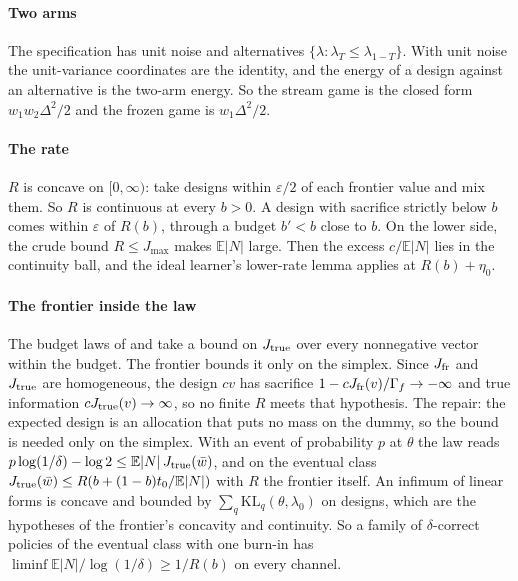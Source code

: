 \paragraph{Two arms} The specification has unit noise and alternatives
$\{\lambda:\lambda_T\le\lambda_{1-T}\}$. With unit noise the unit-variance coordinates are the
identity, and the energy of a design against an alternative is the two-arm energy. So the
stream game is the closed form $w_1w_2\Delta^2/2$ and the frozen game is $w_1\Delta^2/2$.

\paragraph{The rate} $R$ is concave on $[0,\infty)$: take designs within $\varepsilon/2$ of each
frontier value and mix them. So $R$ is continuous at every $b>0$. A design with sacrifice
strictly below $b$ comes within $\varepsilon$ of $R(b)$, through a budget $b'<b$ close to $b$. On
the lower side, the crude bound $R\le J_{\max}$ makes $\mathbb E|N|$ large. Then the excess
$c/\mathbb E|N|$ lies in the continuity ball, and the ideal learner's lower-rate lemma applies at
$R(b)+\eta_0$.

\paragraph{The frontier inside the law} The budget laws of  and
 take a bound on $J_{\rm true}$ over every nonnegative vector
within the budget. The frontier bounds it only on the simplex. Since $J_{\rm fr}$ and $J_{\rm true}$
are homogeneous, the design $cv$ has sacrifice $1-cJ_{\rm fr}(v)/\Gamma_f\to-\infty$ and true
information $cJ_{\rm true}(v)\to\infty$, so no finite $R$ meets that hypothesis. The repair: the
expected design is an allocation that puts no mass on the dummy, so the bound is needed only on
the simplex. With an event of probability $p$ at $\theta$ the law reads
$p\log(1/\delta)-\log2\le\mathbb E|N|\,J_{\rm true}(\bar w)$, and on the eventual class
$J_{\rm true}(\bar w)\le R(b+(1-b)t_0/\mathbb E|N|)$ with $R$ the frontier itself. An infimum of
linear forms is concave and bounded by $\sum_q\mathrm{KL}_q(\theta,\lambda_0)$ on designs, which
are the hypotheses of the frontier's concavity and continuity. So a family of $\delta$-correct
policies of the eventual class with one burn-in has
$\liminf\mathbb E|N|/\log(1/\delta)\ge1/R(b)$ on every channel.

